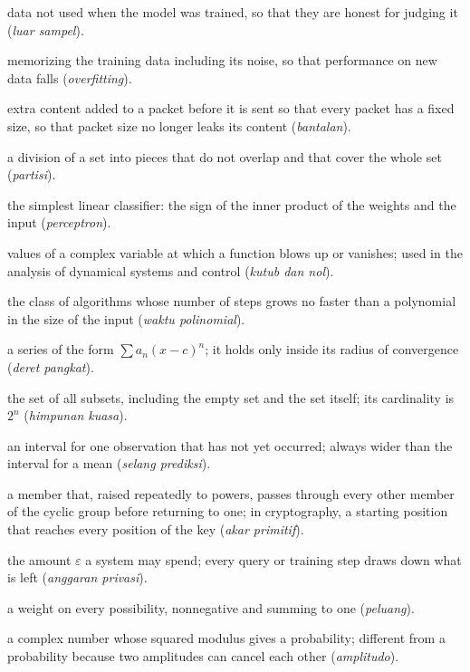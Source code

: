 \begin{description}[style=nextline,itemsep=0.35em]
  \item[Out-of-sample] data not used when the model was trained, so that they are honest for judging it (\emph{luar sampel}).
  \item[Overfitting] memorizing the training data including its noise, so that performance on new data falls (\emph{overfitting}).
  \item[Padding] extra content added to a packet before it is sent so that every packet has a fixed size, so that packet size no longer leaks its content (\emph{bantalan}).
  \item[Partition] a division of a set into pieces that do not overlap and that cover the whole set (\emph{partisi}).
  \item[Perceptron] the simplest linear classifier: the sign of the inner product of the weights and the input (\emph{perceptron}).
  \item[Poles and zeros] values of a complex variable at which a function blows up or vanishes; used in the analysis of dynamical systems and control (\emph{kutub dan nol}).
  \item[Polynomial time] the class of algorithms whose number of steps grows no faster than a polynomial in the size of the input (\emph{waktu polinomial}).
  \item[Power series] a series of the form $\sum a_n(x-c)^n$; it holds only inside its radius of convergence (\emph{deret pangkat}).
  \item[Power set] the set of all subsets, including the empty set and the set itself; its cardinality is $2^n$ (\emph{himpunan kuasa}).
  \item[Prediction interval] an interval for one observation that has not yet occurred; always wider than the interval for a mean (\emph{selang prediksi}).
  \item[Primitive root] a member that, raised repeatedly to powers, passes through every other member of the cyclic group before returning to one; in cryptography, a starting position that reaches every position of the key (\emph{akar primitif}).
  \item[Privacy budget] the amount $\varepsilon$ a system may spend; every query or training step draws down what is left (\emph{anggaran privasi}).
  \item[Probability] a weight on every possibility, nonnegative and summing to one (\emph{peluang}).
  \item[Probability amplitude] a complex number whose squared modulus gives a probability; different from a probability because two amplitudes can cancel each other (\emph{amplitudo}).

\end{description}
